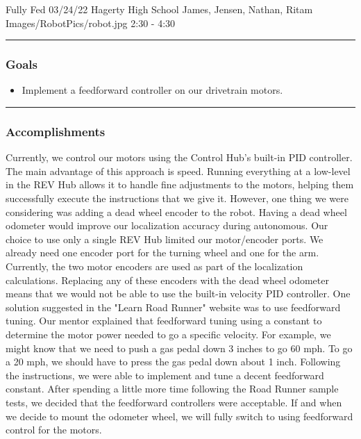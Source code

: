 \insertmeeting 
	{Fully Fed} 
	{03/24/22} 
	{Hagerty High School}
	{James, Jensen, Nathan, Ritam}
	{Images/RobotPics/robot.jpg}
	{2:30 - 4:30}

\noindent\hfil\rule{\textwidth}{.4pt}\hfil
\subsubsection*{Goals}
\begin{itemize}
    \item Implement a feedforward controller on our drivetrain motors. 

\end{itemize} 

\noindent\hfil\rule{\textwidth}{.4pt}\hfil

\subsubsection*{Accomplishments}
Currently, we control our motors using the Control Hub's built-in PID controller. The main advantage of this approach is speed. Running everything at a low-level in the REV Hub allows it to handle fine adjustments to the motors, helping them successfully execute the instructions that we give it. However, one thing we were considering was adding a dead wheel encoder to the robot. Having a dead wheel odometer would improve our localization accuracy during autonomous. Our choice to use only a single REV Hub limited our motor/encoder ports. We already need one encoder port for the turning wheel and one for the arm. Currently, the two motor encoders are used as part of the localization calculations. Replacing any of these encoders with the dead wheel odometer means that we would not be able to use the built-in velocity PID controller. One solution suggested in the "Learn Road Runner" website was to use feedforward tuning. Our mentor explained that feedforward tuning using a constant to determine the motor power needed to go a specific velocity. For example, we might know that we need to push a gas pedal down 3 inches to go 60 mph. To go a 20 mph, we should have to press the gas pedal down about 1 inch. Following the instructions, we were able to implement and tune a decent feedforward constant. After spending a little more time following the Road Runner sample tests, we decided that the feedforward controllers were acceptable. If and when we decide to mount the odometer wheel, we will fully switch to using feedforward control for the motors. 




